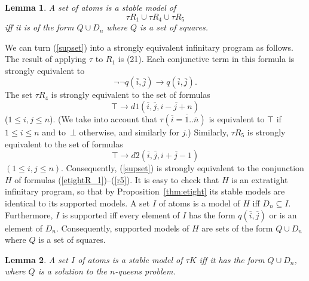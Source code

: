 \documentclass{tlp_mod}
\def\o{\overline}
\def\rar{\rightarrow}
\def\beq{\begin{equation}}
\def\eeq#1{\label{#1}\end{equation}}
\newtheorem{lemma}{Lemma}
\begin{document}
\begin{lemma}\label{lem:sup}
A set of atoms is a stable model of 
\[
\tau R_1 \cup \tau R_4 \cup \tau R_5
\tag{35}
\label{supset}
\]
iff it is of the form $Q \cup D_n$ where $Q$ is a set of squares. 
\end{lemma}

\begin{proof*}
We can turn (\ref{supset}) into a strongly
equivalent infinitary program as follows. The result of applying $\tau$ to 
$R_1$ is (21). 
Each conjunctive term in this formula is strongly equivalent to 
\[
\neg \neg q(\o i, \o j) \rar q(\o i, \o j). 
\tag{36}
\label{etightR_1}
\]
The set $\tau R_4$ is strongly equivalent to   
the set of formulas
\[
  \top \rar d1(\o i,\o j,\o{i-j+n}) 
\tag{37}
\label{r4}
\]
($1 \leq i,j \leq n$).
(We take into account that $\tau(\o i = \o 1..\o n)$ is equivalent to
$\top$ if $1 \leq i \leq n$ and to~$\bot$ otherwise, and similarly for $j$.) 
Similarly, $\tau R_5$ is strongly equivalent to the set of formulas
\[
  \top \rar d2(\o i,\o j,\o{i+j-1})
\tag{38}
\label{r5}
\]
$(1 \leq i,j \leq n)$.
Consequently, (\ref{supset}) is strongly equivalent to the conjunction $H$ of 
formulas (\ref{etightR_1})--(\ref{r5}). 
It is easy to check that $H$ is an extratight infinitary program, so that
by Proposition~\ref{thm:etight} its stable models are identical to its 
supported models. 
A set $I$ of atoms is a model of $H$ iff $D_n \subseteq I$. Furthermore, 
$I$ is supported iff every element of $I$ has the form $q(\o i, \o j)$ or 
is an element of $D_n$. Consequently, supported models of $H$ are sets of the 
form $Q \cup D_n$ where $Q$ is a set of squares.  
\end{proof*}

\begin{lemma}\label{lem:main}
A set $I$ of atoms is a stable model of $\tau K$ iff
it has the form $Q \cup D_n$, where $Q$ is a solution to the $n$-queens 
problem.
\end{lemma}
\end{document}
